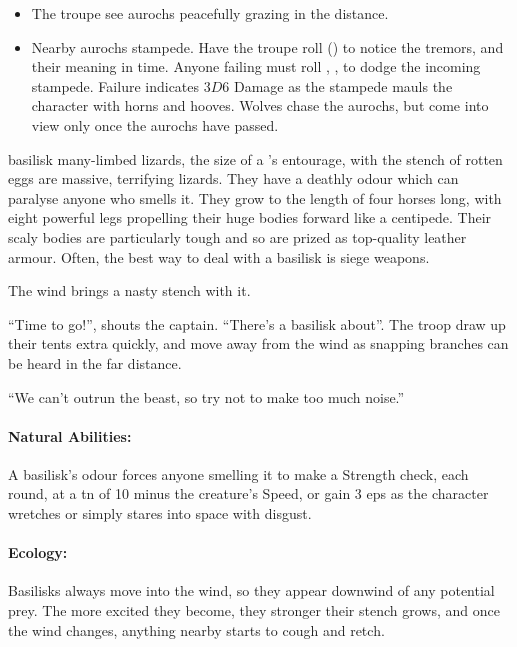 \begin{multicols}{2}
\showEnc

\begin{itemize}
  \item
  The troupe see aurochs peacefully grazing in the distance.
  \item
  Nearby aurochs stampede.
  Have the troupe roll  (\tn[8]) to notice the tremors, and their meaning in time.
  Anyone failing must roll , \tn[9], to dodge the incoming stampede.
  Failure indicates $3D6$ Damage as the stampede mauls the character with horns and hooves.
  Wolves chase the aurochs, but come into view only once the aurochs have passed.

\end{itemize}

  {basilisk}%
  {many-limbed lizards, the size of a 's entourage, with the stench of rotten eggs}%
are massive, terrifying lizards.
They have a deathly odour which can paralyse anyone who smells it.
They grow to the length of four horses long, with eight powerful legs propelling their huge bodies forward like a centipede.
Their scaly bodies are particularly tough and so are prized as top-quality leather armour.
Often, the best way to deal with a basilisk is siege weapons.

\begin{boxtext}
  The wind brings a nasty stench with it.

  ``Time to go!'', shouts the captain.
  ``There's a basilisk about''.
  The troop draw up their tents extra quickly, and move away from the wind as snapping branches can be heard in the far distance.

  ``We can't outrun the beast, so try not to make too much noise.''
\end{boxtext}

\basilisk

\paragraph{Natural Abilities:} A basilisk's odour forces anyone smelling it to make a Strength check, each round, at a \gls{tn} of 10 minus the creature's Speed, or gain 3 \glspl{ep} as the character wretches or simply stares into space with disgust.

\paragraph{Ecology:}
Basilisks always move into the wind, so they appear downwind of any potential prey.
The more excited they become, they stronger their stench grows, and once the wind changes, anything nearby starts to cough and retch.


\end{multicols}
